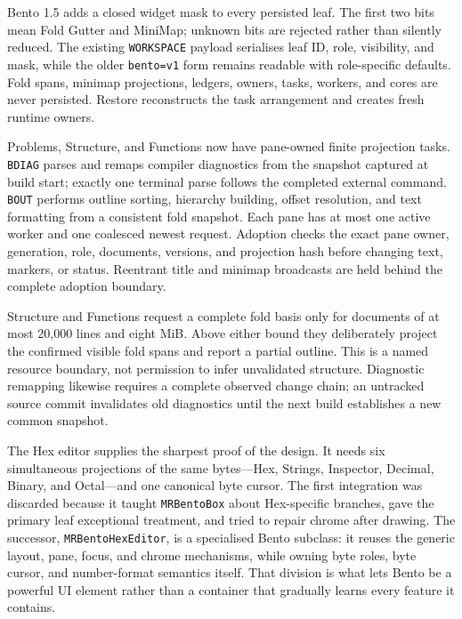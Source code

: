 \documentclass[a4paper,10pt,twoside,openany]{book}
\begin{document}
Bento 1.5 adds a closed widget mask to every persisted leaf. The first two
bits mean Fold Gutter and MiniMap; unknown bits are rejected rather than
silently reduced. The existing \texttt{WORKSPACE} payload serialises leaf ID,
role, visibility, and mask, while the older \texttt{bento=v1} form remains
readable with role-specific defaults. Fold spans, minimap projections, ledgers,
owners, tasks, workers, and cores are never persisted. Restore reconstructs
the task arrangement and creates fresh runtime owners.

Problems, Structure, and Functions now have pane-owned finite projection
tasks. \texttt{BDIAG} parses and remaps compiler diagnostics from the snapshot
captured at build start; exactly one terminal parse follows the completed
external command. \texttt{BOUT} performs outline sorting, hierarchy building,
offset resolution, and text formatting from a consistent fold snapshot. Each
pane has at most one active worker and one coalesced newest request. Adoption
checks the exact pane owner, generation, role, documents, versions, and
projection hash before changing text, markers, or status. Reentrant title and
minimap broadcasts are held behind the complete adoption boundary.

Structure and Functions request a complete fold basis only for documents of at
most 20,000 lines and eight MiB. Above either bound they deliberately project
the confirmed visible fold spans and report a partial outline. This is a named
resource boundary, not permission to infer unvalidated structure. Diagnostic
remapping likewise requires a complete observed change chain; an untracked
source commit invalidates old diagnostics until the next build establishes a
new common snapshot.

The Hex editor supplies the sharpest proof of the design. It needs six
simultaneous projections of the same bytes---Hex, Strings, Inspector, Decimal,
Binary, and Octal---and one canonical byte cursor. The first integration was
discarded because it taught \texttt{MRBentoBox} about Hex-specific branches,
gave the primary leaf exceptional treatment, and tried to repair chrome after
drawing. The successor, \texttt{MRBentoHexEditor}, is a specialised Bento
subclass: it reuses the generic layout, pane, focus, and chrome mechanisms,
while owning byte roles, byte cursor, and number-format semantics itself.
That division is what lets Bento be a powerful UI element rather than a
container that gradually learns every feature it contains.
\end{document}
